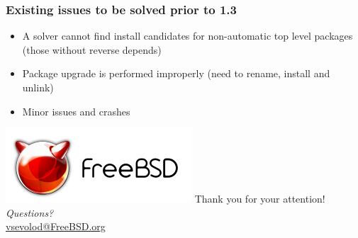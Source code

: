 \documentclass{beamer}
\begin{document}
\begin{frame}
\frametitle{Existing issues to be solved prior to 1.3}
\begin{itemize}
  \item A solver cannot find install candidates for non-automatic top level
  packages (those without reverse depends)
  \item Package upgrade is performed improperly (need to rename, install and
  unlink)
  \item Minor issues and crashes
\end{itemize}
\end{frame}

\begin{frame}
\begin{center}
\includegraphics{logo.pdf}
{\Large Thank you for your attention!} \\
\emph{Questions?} \\[4pt]
\url{vsevolod@FreeBSD.org}
\end{center}
\end{frame}
\end{document}
